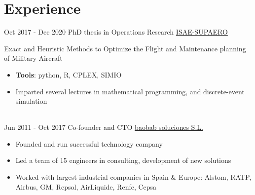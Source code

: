 \documentclass[letterpaper]{twentysecondcv} %
\begin{document}
\makeprofile %


\section{Experience}

\begin{twenty} %
\twentyitem
    	{Oct 2017 -}
		{Dec 2020}
        {PhD thesis in Operations Research}
        {\href{https://www.isae-supaero.fr/en/}{ISAE-SUPAERO}}
        {}
        {Exact and Heuristic Methods to Optimize the Flight and Maintenance planning of Military Aircraft
        {\begin{itemize}
                \item \textbf{Tools}: python, R, CPLEX, SIMIO
                \item Imparted several lectures in mathematical programming, and discrete-event simulation
                \end{itemize}}}
        \\
	\twentyitem
    	{Jun 2011 -}
		{Oct 2017}
        {Co-founder and CTO}
        {\href{https://baobabsoluciones.es/en/}{baobab soluciones S.L.}}
        {}
        {
        {\begin{itemize}
        \item Founded and run successful technology company
        \item Led a team of 15 engineers in consulting, development of new solutions
        \item Worked with largest industrial companies in Spain \&  Europe: Alstom, RATP, Airbus, GM, Repsol, AirLiquide, Renfe, Cepsa
    \end{itemize}}
        }        
\end{twenty}

\vspace{-0.5cm}
\end{document}
